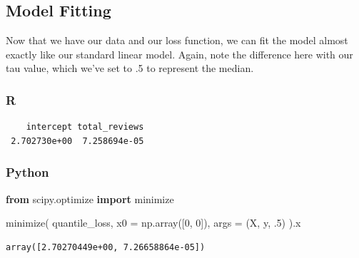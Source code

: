 \documentclass[
  letterpaper,
]{krantz}
\newenvironment{Shaded}{}{}
\newcommand{\AttributeTok}[1]{\textcolor[rgb]{0.49,0.56,0.16}{#1}}
\newcommand{\DecValTok}[1]{\textcolor[rgb]{0.25,0.63,0.44}{#1}}
\newcommand{\FloatTok}[1]{\textcolor[rgb]{0.25,0.63,0.44}{#1}}
\newcommand{\FunctionTok}[1]{\textcolor[rgb]{0.02,0.16,0.49}{#1}}
\newcommand{\ImportTok}[1]{\textcolor[rgb]{0.00,0.50,0.00}{\textbf{#1}}}
\newcommand{\NormalTok}[1]{#1}
\newcommand{\OperatorTok}[1]{\textcolor[rgb]{0.40,0.40,0.40}{#1}}
\newcommand{\SpecialCharTok}[1]{\textcolor[rgb]{0.25,0.44,0.63}{#1}}
\begin{document}
\subsection{Model Fitting}\label{model-fitting-2}

Now that we have our data and our loss function, we can fit the model
almost exactly like our standard linear model. Again, note the
difference here with our tau value, which we've set to .5 to represent
the median.

\subsubsection{R}

\begin{Shaded}
\end{Shaded}

\begin{verbatim}
    intercept total_reviews 
 2.702730e+00  7.258694e-05 
\end{verbatim}

\subsubsection{Python}

\begin{Shaded}
\begin{Highlighting}[]
\ImportTok{from}\NormalTok{ scipy.optimize }\ImportTok{import}\NormalTok{ minimize}

\NormalTok{minimize(}
\NormalTok{  quantile\_loss, }
\NormalTok{  x0 }\OperatorTok{=}\NormalTok{ np.array([}\DecValTok{0}\NormalTok{, }\DecValTok{0}\NormalTok{]), }
\NormalTok{  args }\OperatorTok{=}\NormalTok{ (X, y, }\FloatTok{.5}\NormalTok{)}
\NormalTok{  ).x}
\end{Highlighting}
\end{Shaded}

\begin{verbatim}
array([2.70270449e+00, 7.26658864e-05])
\end{verbatim}
\end{document}

